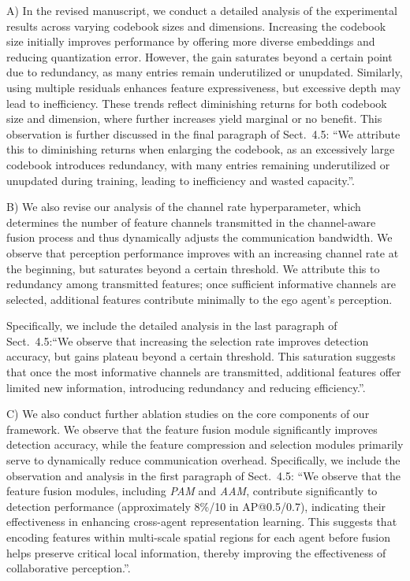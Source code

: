\documentclass[12pt,a4paper]{article}
\begin{document}
A) In the revised manuscript, we conduct a detailed analysis of the experimental results across varying codebook sizes and dimensions. Increasing the codebook size initially improves performance by offering more diverse embeddings and reducing quantization error. However, the gain saturates beyond a certain point due to redundancy, as many entries remain underutilized or unupdated. Similarly, using multiple residuals enhances feature expressiveness, but excessive depth may lead to inefficiency. These trends reflect diminishing returns for both codebook size and dimension, where further increases yield marginal or no benefit. This observation is further discussed in the final paragraph of Sect.~4.5: ``We attribute this to diminishing returns when enlarging the codebook, as an excessively large codebook introduces redundancy, with many entries remaining underutilized or unupdated during training, leading to inefficiency and wasted capacity.''.


B) We also revise our analysis of the channel rate hyperparameter, which determines the number of feature channels transmitted in the channel-aware fusion process and thus dynamically adjusts the communication bandwidth. We observe that perception performance improves with an increasing channel rate at the beginning, but saturates beyond a certain threshold. We attribute this to redundancy among transmitted features; once sufficient informative channels are selected, additional features contribute minimally to the ego agent's perception.

Specifically, we include the detailed analysis in the last paragraph of Sect.~4.5:``We observe that increasing the selection rate improves detection accuracy, but gains plateau beyond a certain threshold. This saturation suggests that once the most informative channels are transmitted, additional features offer limited new information, introducing redundancy and reducing efficiency.''.

C) We also conduct further ablation studies on the core components of our framework. We observe that the feature fusion module significantly improves detection accuracy, while the feature compression and selection modules primarily serve to dynamically reduce communication overhead.
Specifically, we include the observation and analysis in the first paragraph of Sect.~4.5: ``We observe that the feature fusion modules, including \textit{PAM} and \textit{AAM}, contribute significantly to detection performance (approximately 8\%/10 in AP@0.5/0.7), indicating their effectiveness in enhancing cross-agent representation learning.
This suggests that encoding features within multi-scale spatial regions for each agent before fusion helps preserve critical local information, thereby improving the effectiveness of collaborative perception.''.
\end{document}
